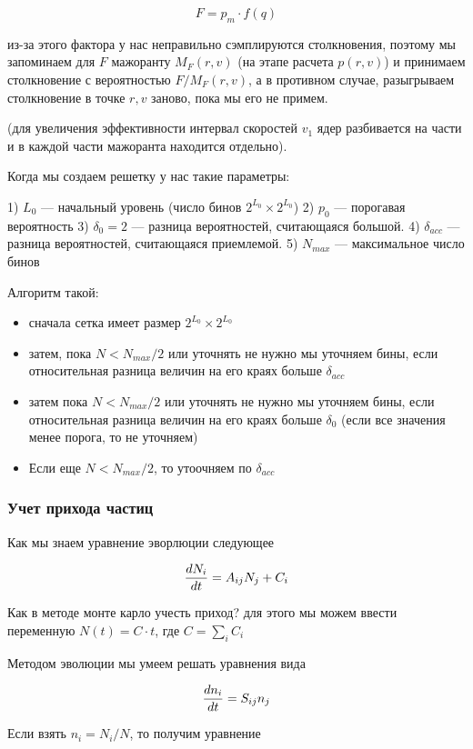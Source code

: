 \[
	F = p_m\cdot f(q)
\]

из-за этого фактора у нас неправильно сэмплируются столкновения, поэтому мы запоминаем для $F$ мажоранту $M_F(r,v)$ (на этапе расчета $p(r,v)$) и принимаем столкновение с вероятностью $F/M_F(r,v)$, а в противном случае, разыгрываем столкновение в точке $r,v$ заново, пока мы его не примем.

(для увеличения эффективности интервал скоростей $v_1$ ядер разбивается на части и в каждой части мажоранта находится отдельно).

Когда мы создаем решетку у нас такие параметры:

1) $L_0$ --- начальный уровень (число бинов $2^{L_0} \times 2^{L_0}$)
2) $p_{0}$ --- порогавая вероятность
3) $\delta_0 = 2$ --- разница вероятностей, считающаяся большой.
4) $\delta_{acc}$ --- разница вероятностей, считающаяся приемлемой.
5) $N_{max}$ --- максимальное число бинов

Алгоритм такой:

\begin{itemize}
	\item сначала сетка имеет размер $2^{L_0} \times 2^{L_0}$
	\item затем, пока $N<N_{max}/2$ или уточнять не нужно мы уточняем бины, если относительная разница величин на его краях больше $\delta_{acc}$
	\item затем пока $N<N_{max}/2$ или уточнять не нужно  мы уточняем бины, если относительная разница величин на его краях больше $\delta_{0}$ (если все значения менее порога, то не уточняем)
	\item Если еще $N<N_{max}/2$, то утоочняем по $\delta_{acc}$
\end{itemize}


\subsubsection{Учет прихода частиц}

Как мы знаем уравнение эворлюции следующее

\[
	\frac{d N_i}{d t} =  A_{ij} N_j + C_i
\]

Как в методе монте карло учесть приход? 
для этого мы можем ввести переменную $N(t) = C \cdot t$, где $C = \sum_i C_i$

Методом эволюции мы умеем решать уравнения вида

\[
	\frac{d n_i}{d t} =  S_{ij} n_j 
\]

Если взять $n_i = N_i/N$, то получим уравнение

